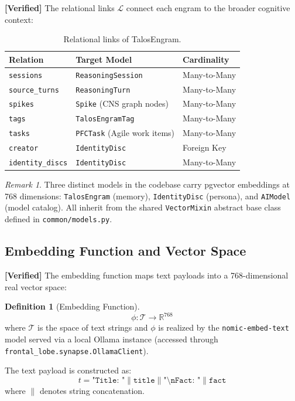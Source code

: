 \documentclass[11pt]{article}
\newcommand{\verified}{\textcolor{verifiedgreen}{\textbf{[Verified]}}}
\theoremstyle{definition}
\newtheorem{definition}{Definition}[section]
\theoremstyle{remark}
\newtheorem{remark}{Remark}[section]
\begin{document}
\verified{} The relational links $\mathcal{L}$ connect each engram to the
broader cognitive context:

\begin{table}[h]
\centering
\begin{tabular}{@{}lll@{}}
\toprule
\textbf{Relation} & \textbf{Target Model} & \textbf{Cardinality} \\
\midrule
\texttt{sessions} & \texttt{ReasoningSession} & Many-to-Many \\
\texttt{source\_turns} & \texttt{ReasoningTurn} & Many-to-Many \\
\texttt{spikes} & \texttt{Spike} (CNS graph nodes) & Many-to-Many \\
\texttt{tags} & \texttt{TalosEngramTag} & Many-to-Many \\
\texttt{tasks} & \texttt{PFCTask} (Agile work items) & Many-to-Many \\
\texttt{creator} & \texttt{IdentityDisc} & Foreign Key \\
\texttt{identity\_discs} & \texttt{IdentityDisc} & Many-to-Many \\
\bottomrule
\end{tabular}
\caption{Relational links of TalosEngram.}
\label{tab:engram-relations}
\end{table}

\begin{remark}
Three distinct models in the codebase carry pgvector embeddings at 768
dimensions: \texttt{TalosEngram} (memory), \texttt{IdentityDisc} (persona),
and \texttt{AIModel} (model catalog). All inherit from the shared
\texttt{VectorMixin} abstract base class defined in \texttt{common/models.py}.
\end{remark}

\subsection{Embedding Function and Vector Space}

\verified{} The embedding function maps text payloads into a 768-dimensional
real vector space:

\begin{definition}[Embedding Function]
\label{def:embedding}
\[
  \phi : \mathcal{T} \longrightarrow \mathbb{R}^{768}
\]
where $\mathcal{T}$ is the space of text strings and $\phi$ is realized by the
\texttt{nomic-embed-text} model served via a local Ollama instance (accessed
through \texttt{frontal\_lobe.synapse.OllamaClient}).

The text payload is constructed as:
\[
  t = \texttt{"Title: "} \| \texttt{title} \| \texttt{"\textbackslash nFact: "} \| \texttt{fact}
\]
where $\|$ denotes string concatenation.
\end{definition}
\end{document}
